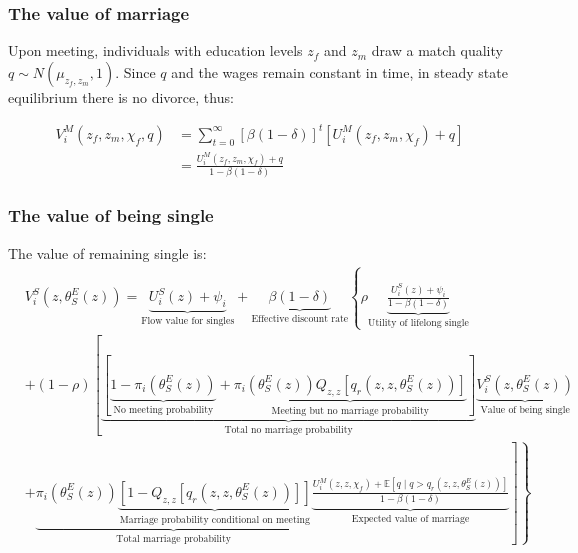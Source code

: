 \documentclass{beamer}
\begin{document}
\begin{frame}
	\frametitle{The value of marriage}
	
	Upon meeting, individuals with education levels $z_f$ and $z_m$ draw a match quality $q\sim N\left(\mu_{z_f,z_m},1\right)$. Since $q$ and the wages remain constant in time, in steady state equilibrium there is no divorce, thus:
	
	\begin{align*}
	V_i^M\left(z_f,z_m,\chi_f,q\right)&=\sum_{t=0}^{\infty}\left[\beta\left(1-\delta\right)\right]^t\left[U_i^M(z_f,z_m,\chi_f)+q\right]\\&= \frac{U_i^M(z_f,z_m,\chi_f)+q}{1-\beta\left(1-\delta\right)}
	\end{align*}
\end{frame}

\begin{frame}
	\frametitle{The value of being single}
	\tiny
	The value of remaining single is: 
	\begin{align*}\label{eq:val_single}
	& V_i^S\left(z,\theta_{S}^E(z)\right) = \underbrace{U_i^S\left(z\right)+\psi_i}_{\text{Flow value for singles}} +\underbrace{\beta\left(1-\delta\right)}_{\text{Effective discount rate}}\left\lbrace \rho \underbrace{\frac{U_i^S\left(z\right)+\psi_i}{1-\beta\left(1-\delta\right)}}_{\text{Utility of lifelong single}} \right. \nonumber \\ 
	& \left. + \left(1-\rho\right)\left[ \underbrace{\left[\underbrace{1-\pi_{i}\left(\theta_{S}^E(z)\right)}_{\text{No meeting probability}}+\underbrace{\pi_{i}\left(\theta_{S}^E(z)\right)Q_{z,z}\left[q_r\left(z,z,\theta_{S}^E(z)\right)\right]}_{\text{Meeting but no marriage probability}}\right]}_{\text{Total no marriage probability}}\underbrace{V_i^S\left(z,\theta_{S}^E(z)\right)}_{\text{Value of being single}} \right. \right. \nonumber \\ & \left. \left. + \underbrace{\pi_{i}\left(\theta_{S}^E(z)\right)\underbrace{\left[1-Q_{z,z}\left[q_r\left(z,z,\theta_{S}^E(z)\right)\right]\right]}_{\text{Marriage probability conditional on meeting}}}_{\text{Total marriage probability}}\underbrace{\frac{U_i^M(z,z,\chi_f)+\mathbb{E}\left[q\mid q>q_r\left(z,z,\theta_{S}^E(z)\right)\right]}{1-\beta\left(1-\delta\right)}}_{\text{Expected value of marriage}} \right] \right\rbrace 
	\end{align*}
\end{frame}
\end{document}

